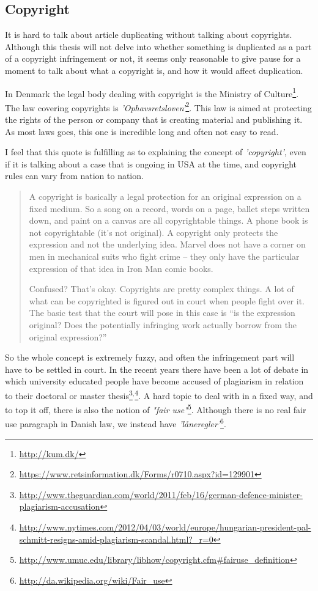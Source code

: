 \subsection{Copyright}
It is hard to talk about article duplicating without talking about copyrights. Although this thesis will not delve into whether something is duplicated as a part of a copyright infringement or not, it seems only reasonable to give pause for a moment to talk about what a copyright is, and how it would affect duplication.

In Denmark the legal body dealing with copyright is the Ministry of Culture\footnote{\url{http://kum.dk/}}. The law covering copyrights is \textit{'Ophavsretsloven'}\footnote{\url{https://www.retsinformation.dk/Forms/r0710.aspx?id=129901}}. This law is aimed at protecting the rights of the person or company that is creating material and publishing it. As most laws goes, this one is incredible long and often not easy to read.

I feel that this quote is fulfilling as to explaining the concept of \textit{'copyright'}, even if it is talking about a case that is ongoing in USA at the time, and copyright rules can vary from nation to nation.
\begin{quote}
A copyright is basically a legal protection for an original expression on a fixed medium. So a song on a record, words on a page, ballet steps written down, and paint on a canvas are all copyrightable things. A phone book is not copyrightable (it's not original). A copyright only protects the expression and not the underlying idea. Marvel does not have a corner on men in mechanical suits who fight crime – they only have the particular expression of that idea in Iron Man comic books.

Confused? That's okay. Copyrights are pretty complex things. A lot of what can be copyrighted is figured out in court when people fight over it. The basic test that the court will pose in this case is “is the expression original? Does the potentially infringing work actually borrow from the original expression?” ~\cite{Copyright}
\end{quote}

So the whole concept is extremely fuzzy, and often the infringement part will have to be settled in court. In the recent years there have been a lot of debate in which university educated people have become accused of plagiarism  in relation to their doctoral or master thesis\footnote{\url{http://www.theguardian.com/world/2011/feb/16/german-defence-minister-plagiarism-accusation}}$^{,}$\footnote{\url{http://www.nytimes.com/2012/04/03/world/europe/hungarian-president-pal-schmitt-resigns-amid-plagiarism-scandal.html?_r=0}}. A hard topic to deal with in a fixed way, and to top it off, there is also the notion of \textit{"fair use"}\footnote{\url{http://www.umuc.edu/library/libhow/copyright.cfm\#fairuse_definition}}. Although there is no real fair use paragraph in Danish law, we instead have \textit{'låneregler'}\footnote{\url{http://da.wikipedia.org/wiki/Fair_use}}. 

